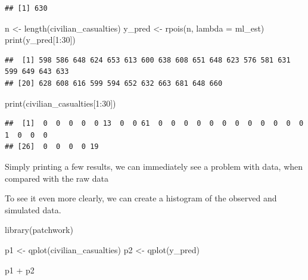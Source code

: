 \documentclass[
]{book}
\newenvironment{Shaded}{\begin{snugshade}}{\end{snugshade}}
\newcommand{\AttributeTok}[1]{\textcolor[rgb]{0.77,0.63,0.00}{#1}}
\newcommand{\DecValTok}[1]{\textcolor[rgb]{0.00,0.00,0.81}{#1}}
\newcommand{\FunctionTok}[1]{\textcolor[rgb]{0.00,0.00,0.00}{#1}}
\newcommand{\NormalTok}[1]{#1}
\newcommand{\OtherTok}[1]{\textcolor[rgb]{0.56,0.35,0.01}{#1}}
\newcommand{\SpecialCharTok}[1]{\textcolor[rgb]{0.00,0.00,0.00}{#1}}
\begin{document}
\begin{verbatim}
## [1] 630
\end{verbatim}

\begin{Shaded}
\begin{Highlighting}[]
\NormalTok{n }\OtherTok{\textless{}{-}} \FunctionTok{length}\NormalTok{(civilian\_casualties)}
\NormalTok{y\_pred }\OtherTok{\textless{}{-}} \FunctionTok{rpois}\NormalTok{(n, }\AttributeTok{lambda =}\NormalTok{ ml\_est)}
\FunctionTok{print}\NormalTok{(y\_pred[}\DecValTok{1}\SpecialCharTok{:}\DecValTok{30}\NormalTok{])}
\end{Highlighting}
\end{Shaded}

\begin{verbatim}
##  [1] 598 586 648 624 653 613 600 638 608 651 648 623 576 581 631 599 649 643 633
## [20] 628 608 616 599 594 652 632 663 681 648 660
\end{verbatim}

\begin{Shaded}
\begin{Highlighting}[]
\FunctionTok{print}\NormalTok{(civilian\_casualties[}\DecValTok{1}\SpecialCharTok{:}\DecValTok{30}\NormalTok{])}
\end{Highlighting}
\end{Shaded}

\begin{verbatim}
##  [1]  0  0  0  0  0 13  0  0 61  0  0  0  0  0  0  0  0  0  0  0  0  1  0  0  0
## [26]  0  0  0  0 19
\end{verbatim}

Simply printing a few results, we can immediately see a problem with
data, when compared with the raw data

To see it even more clearly, we can create a histogram of the observed
and simulated data.

\begin{Shaded}
\begin{Highlighting}[]
\FunctionTok{library}\NormalTok{(patchwork)}

\NormalTok{p1 }\OtherTok{\textless{}{-}} \FunctionTok{qplot}\NormalTok{(civilian\_casualties)}
\NormalTok{p2 }\OtherTok{\textless{}{-}} \FunctionTok{qplot}\NormalTok{(y\_pred)}

\NormalTok{p1 }\SpecialCharTok{+}\NormalTok{ p2}
\end{Highlighting}
\end{Shaded}
\end{document}
